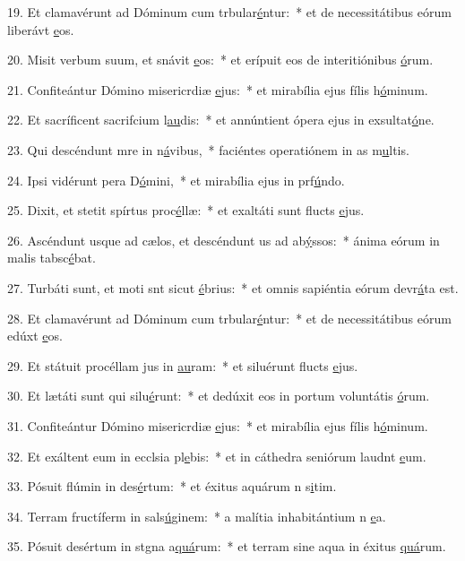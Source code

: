 19. Et clamavérunt ad Dóminum cum trbular\uline{é}ntur:~* et de necessitátibus eórum liberávt \uline{e}os.\par 
20. Misit verbum suum, et snávit \uline{e}os:~* et erípuit eos de interitiónibus \uline{ó}rum.\par 
21. Confiteántur Dómino misericrdiæ \uline{e}jus:~* et mirabília ejus fílis h\uline{ó}minum.\par 
22. Et sacríficent sacrifcium l\uline{au}dis:~* et annúntient ópera ejus in exsultat\uline{ó}ne.\par 
23. Qui descéndunt mre in n\uline{á}vibus,~* faciéntes operatiónem in as m\uline{u}ltis.\par 
24. Ipsi vidérunt pera D\uline{ó}mini,~* et mirabília ejus in prf\uline{ú}ndo.\par 
25. Dixit, et stetit spírtus proc\uline{é}llæ:~* et exaltáti sunt flucts \uline{e}jus.\par 
26. Ascéndunt usque ad cælos, et descéndunt us ad ab\uline{ý}ssos:~* ánima eórum in malis tabsc\uline{é}bat.\par 
27. Turbáti sunt, et moti snt sicut \uline{é}brius:~* et omnis sapiéntia eórum devr\uline{á}ta est.\par 
28. Et clamavérunt ad Dóminum cum trbular\uline{é}ntur:~* et de necessitátibus eórum edúxt \uline{e}os.\par 
29. Et státuit procéllam jus in \uline{au}ram:~* et siluérunt flucts \uline{e}jus.\par 
30. Et lætáti sunt qui silu\uline{é}runt:~* et dedúxit eos in portum voluntátis \uline{ó}rum.\par 
31. Confiteántur Dómino misericrdiæ \uline{e}jus:~* et mirabília ejus fílis h\uline{ó}minum.\par 
32. Et exáltent eum in ecclsia pl\uline{e}bis:~* et in cáthedra seniórum laudnt \uline{e}um.\par 
33. Pósuit flúmin in des\uline{é}rtum:~* et éxitus aquárum n s\uline{i}tim.\par 
34. Terram fructíferm in sals\uline{ú}ginem:~* a malítia inhabitántium n \uline{e}a.\par 
35. Pósuit desértum in stgna a\uline{quá}rum:~* et terram sine aqua in éxitus \uline{quá}rum.\par 
